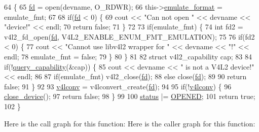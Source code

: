 \begin{DoxyCode}
64                                                                \{
65     \hyperlink{classv4lcap_a38109593bde997dad13b3a461569573d}{fd} = open(devname, O\_RDWR);
66     this->\hyperlink{classv4lcap_a21b4c152f56ecc309a490cb8ab4ce117}{emulate\_format} = emulate\_fmt;
67 
68     \textcolor{keywordflow}{if}(\hyperlink{classv4lcap_a38109593bde997dad13b3a461569573d}{fd} < 0) \{
69         cout << \textcolor{stringliteral}{"Can not open "} << devname << \textcolor{stringliteral}{"device!"} << endl;
70         \textcolor{keywordflow}{return} \textcolor{keyword}{false};
71     \}
72 
73     \textcolor{keywordflow}{if}(emulate\_fmt) \{
74         \textcolor{keywordtype}{int} fd2 = v4l2\_fd\_open(\hyperlink{classv4lcap_a38109593bde997dad13b3a461569573d}{fd}, V4L2\_ENABLE\_ENUM\_FMT\_EMULATION);
75 
76         \textcolor{keywordflow}{if}(fd2 < 0) \{
77             cout << \textcolor{stringliteral}{"Cannot use libv4l2 wrapper for "} << devname << \textcolor{stringliteral}{"!"} << endl;
78             emulate\_fmt = \textcolor{keyword}{false};
79         \}
80     \}
81 
82     \textcolor{keyword}{struct }v4l2\_capability cap;
83 
84     \textcolor{keywordflow}{if}(!\hyperlink{classv4lcap_aff4ca1e9742c8659582810529b8c9a2c}{query\_capability}(&cap)) \{
85         cout << devname << \textcolor{stringliteral}{" is not a V4L2 device!"} << endl;
86 
87         \textcolor{keywordflow}{if}(emulate\_fmt) v4l2\_close(\hyperlink{classv4lcap_a38109593bde997dad13b3a461569573d}{fd});
88          \textcolor{keywordflow}{else} close(\hyperlink{classv4lcap_a38109593bde997dad13b3a461569573d}{fd});
89 
90         \textcolor{keywordflow}{return} \textcolor{keyword}{false};
91     \}
92 
93     \hyperlink{classv4lcap_a5e57bbf84383d7b42d0cc9d1e7e03abb}{v4lconv} = v4lconvert\_create(\hyperlink{classv4lcap_a38109593bde997dad13b3a461569573d}{fd});
94 
95     \textcolor{keywordflow}{if}(!\hyperlink{classv4lcap_a5e57bbf84383d7b42d0cc9d1e7e03abb}{v4lconv}) \{
96         \hyperlink{classv4lcap_adbb658a6f3248f24ee7926722e76ca43}{close\_device}();
97         \textcolor{keywordflow}{return} \textcolor{keyword}{false};
98     \}
99 
100     \hyperlink{classv4lcap_ae90192b024d952b464408e0ffd95d90a}{status} |= \hyperlink{classv4lcap_a54af28c37f6a06c466390050290b8a5fa4015ad97149ce726bbc1843cb9527972}{OPENED};
101     \textcolor{keywordflow}{return} \textcolor{keyword}{true};
102 \}
\end{DoxyCode}
Here is the call graph for this function\+:
Here is the caller graph for this function\+:
\mbox{\label{classv4lcap_a238573a18b367ebc812a49f4f1917012}} 
